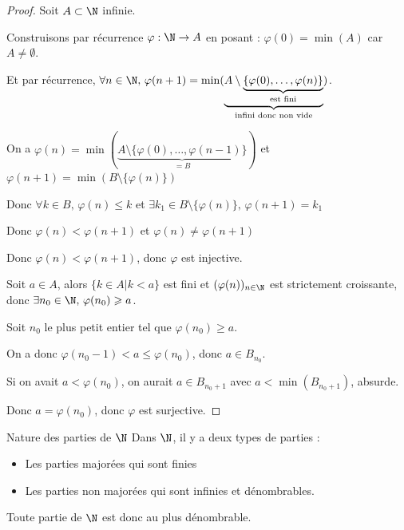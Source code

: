 \begin{proof}
    Soit $A \subset \N$ infinie. 

    Construisons par récurrence $\varphi : \N \to A$ en posant : $\varphi(0) = \min(A)$ car $A \neq \emptyset$.

    Et par récurrence, $\forall n \in \N, \, \varphi(n+1) = \min(\underbrace{A \setminus \underbrace{\{\varphi(0), \ldots, \varphi(n)\}}_{\text{est fini}}}_{\text{infini donc non vide}})$.


    \svspace On a $\varphi(n) = \min(\underbrace{A \setminus \{\varphi(0), \ldots, \varphi(n-1)\}}_{= B })$ 
    et $\varphi(n + 1) = \min(B \setminus \{ \varphi(n) \})$ 

    Donc $\forall k \in B, \, \varphi(n) \leqslant k$ et $\exists k_1 \in B \setminus \{\varphi(n)\}, \, \varphi(n + 1) = k_1$

    Donc $\varphi(n) < \varphi(n + 1)$ et $\varphi (n) \neq \varphi(n + 1)$

    Donc $\varphi(n) < \varphi(n + 1)$, donc $\varphi$ est injective.

    Soit $a \in A$, alors $\{k \in A | k < a\}$ est fini et $(\varphi(n))_{n \in \N}$ est strictement croissante, donc
    $\exists n_0 \in \N, \, \varphi(n_0) \geqslant a$.

    Soit $n_0$ le plus petit entier tel que $\varphi(n_0) \geqslant a$.

    On a donc $\varphi(n_0 - 1) < a \leqslant \varphi(n_0)$, donc $a \in B_{n_0}$. 

    Si on avait $a < \varphi(n_0)$, on aurait $a \in B_{n_0 + 1}$ avec $a < \min (B_{n_0 + 1})$, absurde. 
    
    Donc $a = \varphi(n_0)$, donc $\varphi$ est surjective.
\end{proof}


\begin{proposition}{Nature des parties de $\N$}{}
    Dans $\N$, il y a deux types de parties : 
    \begin{itemize}
        \item Les parties majorées qui sont finies 
        \item Les parties non majorées qui sont infinies et dénombrables.
    \end{itemize}

    Toute partie de $\N$ est donc au plus dénombrable. 
\end{proposition}


